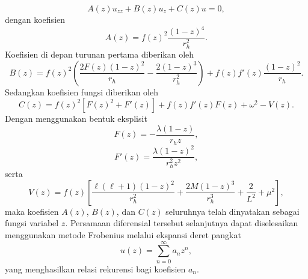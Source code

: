 \begin{equation} A(z) u_{zz} + B(z) u_z + C(z) u = 0, \end{equation}
dengan koefisien
\begin{equation} \boxed{ A(z) = f(z)^2 \frac{(1-z)^4}{r_h^2}. } \end{equation}
Koefisien di depan turunan pertama diberikan oleh
\begin{equation} \boxed{ B(z) = f(z)^2 \left( \frac{2F(z)(1-z)^2}{r_h} - \frac{2(1-z)^3}{r_h^2} \right) + f(z)f'(z) \frac{(1-z)^2}{r_h}. } \end{equation}
Sedangkan koefisien fungsi diberikan oleh
\begin{equation} \boxed{ C(z) = f(z)^2 \left[ F(z)^2 + F'(z) \right] + f(z)f'(z) F(z) + \omega^2 - V(z). } \end{equation}
Dengan menggunakan bentuk eksplisit
\begin{equation} F(z) = -\frac{\lambda(1-z)}{r_hz}, \end{equation}
\begin{equation} F'(z) = \frac{\lambda(1-z)^2}{r_h^2z^2}, \end{equation}
serta
\begin{equation} V(z) = f(z) \left[ \frac{\ell(\ell+1)(1-z)^2}{r_h^2} + \frac{2M(1-z)^3}{r_h^3} + \frac{2}{L^2} + \mu^2 \right], \end{equation}
maka koefisien $A(z)$, $B(z)$, dan $C(z)$ seluruhnya telah dinyatakan sebagai fungsi variabel $z$. Persamaan diferensial tersebut selanjutnya dapat diselesaikan menggunakan metode Frobenius melalui ekspansi deret pangkat
\begin{equation} u(z) = \sum_{n=0}^{\infty} a_nz^n, \end{equation}
yang menghasilkan relasi rekurensi bagi koefisien $a_n$.